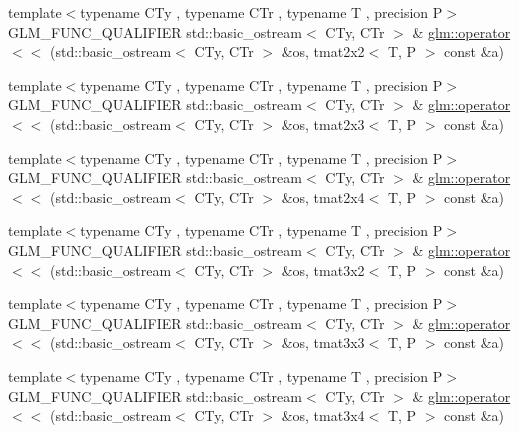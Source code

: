 \begin{DoxyCompactItemize}
\item 
{\footnotesize template$<$typename C\+Ty , typename C\+Tr , typename T , precision P$>$ }\\G\+L\+M\+\_\+\+F\+U\+N\+C\+\_\+\+Q\+U\+A\+L\+I\+F\+I\+E\+R std\+::basic\+\_\+ostream$<$ C\+Ty, C\+Tr $>$ \& \hyperlink{group__gtx__io_ga61fbdb6ad70c4c8d750a847251fa4a4a}{glm\+::operator$<$$<$} (std\+::basic\+\_\+ostream$<$ C\+Ty, C\+Tr $>$ \&os, tmat2x2$<$ T, P $>$ const \&a)
\item 
{\footnotesize template$<$typename C\+Ty , typename C\+Tr , typename T , precision P$>$ }\\G\+L\+M\+\_\+\+F\+U\+N\+C\+\_\+\+Q\+U\+A\+L\+I\+F\+I\+E\+R std\+::basic\+\_\+ostream$<$ C\+Ty, C\+Tr $>$ \& \hyperlink{group__gtx__io_ga032043616f87c7eefaf4d83a20f779a5}{glm\+::operator$<$$<$} (std\+::basic\+\_\+ostream$<$ C\+Ty, C\+Tr $>$ \&os, tmat2x3$<$ T, P $>$ const \&a)
\item 
{\footnotesize template$<$typename C\+Ty , typename C\+Tr , typename T , precision P$>$ }\\G\+L\+M\+\_\+\+F\+U\+N\+C\+\_\+\+Q\+U\+A\+L\+I\+F\+I\+E\+R std\+::basic\+\_\+ostream$<$ C\+Ty, C\+Tr $>$ \& \hyperlink{group__gtx__io_ga1a2314cab31da0e736bc5e601bcb8f37}{glm\+::operator$<$$<$} (std\+::basic\+\_\+ostream$<$ C\+Ty, C\+Tr $>$ \&os, tmat2x4$<$ T, P $>$ const \&a)
\item 
{\footnotesize template$<$typename C\+Ty , typename C\+Tr , typename T , precision P$>$ }\\G\+L\+M\+\_\+\+F\+U\+N\+C\+\_\+\+Q\+U\+A\+L\+I\+F\+I\+E\+R std\+::basic\+\_\+ostream$<$ C\+Ty, C\+Tr $>$ \& \hyperlink{group__gtx__io_gac825ec168ada9209dad314bca460ceef}{glm\+::operator$<$$<$} (std\+::basic\+\_\+ostream$<$ C\+Ty, C\+Tr $>$ \&os, tmat3x2$<$ T, P $>$ const \&a)
\item 
{\footnotesize template$<$typename C\+Ty , typename C\+Tr , typename T , precision P$>$ }\\G\+L\+M\+\_\+\+F\+U\+N\+C\+\_\+\+Q\+U\+A\+L\+I\+F\+I\+E\+R std\+::basic\+\_\+ostream$<$ C\+Ty, C\+Tr $>$ \& \hyperlink{group__gtx__io_ga3ea3ca90bea2e763079f09af1e5d50ab}{glm\+::operator$<$$<$} (std\+::basic\+\_\+ostream$<$ C\+Ty, C\+Tr $>$ \&os, tmat3x3$<$ T, P $>$ const \&a)
\item 
{\footnotesize template$<$typename C\+Ty , typename C\+Tr , typename T , precision P$>$ }\\G\+L\+M\+\_\+\+F\+U\+N\+C\+\_\+\+Q\+U\+A\+L\+I\+F\+I\+E\+R std\+::basic\+\_\+ostream$<$ C\+Ty, C\+Tr $>$ \& \hyperlink{group__gtx__io_ga5a5ca6f99c027a2277b24de487198fe0}{glm\+::operator$<$$<$} (std\+::basic\+\_\+ostream$<$ C\+Ty, C\+Tr $>$ \&os, tmat3x4$<$ T, P $>$ const \&a)

\end{DoxyCompactItemize}

